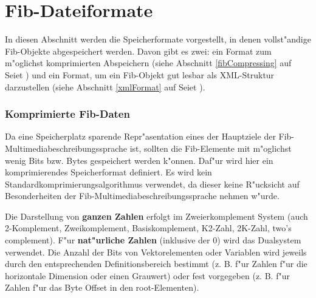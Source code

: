 %
%
%
%
%

\newpage
\part{Fib-Dateiformate}
\label{partFileFormat}

In diesen Abschnitt werden die Speicherformate vorgestellt, in denen vollst"andige Fib-Objekte abgespeichert werden. Davon gibt es zwei: ein Format zum m"oglichst komprimierten Abspeichern (siehe Abschnitt \ref{fibCompressing} auf Seiet \pageref{fibCompressing}) und ein Format, um ein Fib-Objekt gut lesbar als XML-Struktur darzustellen (siehe Abschnitt \ref{xmlFormat} auf Seiet \pageref{xmlFormat}).


\section{Komprimierte Fib-Daten}
\label{fibCompressing}

Da eine Speicherplatz sparende Repr"asentation eines der Hauptziele der Fib-Multi\-media\-be\-schrei\-bungs\-sprache ist, sollten die Fib-Elemente mit m"oglichst wenig Bits bzw. Bytes gespeichert werden k"onnen. Daf"ur wird hier ein komprimierendes Speicherformat definiert. Es wird kein Standardkomprimierungsalgorithmus verwendet, da dieser keine R"ucksicht auf Besonderheiten der Fib-Multimedia\-be\-schrei\-bungs\-sprache nehmen w"urde.


Die Darstellung von \textbf{ganzen Zahlen} erfolgt im Zweierkomplement System (auch 2-Komplement, Zweikomplement, Basiskomplement, K2-Zahl, 2K-Zahl, two's complement). F"ur \textbf{nat"urliche Zahlen} (inklusive der $0$) wird das Dualsystem verwendet. Die Anzahl der Bits von Vektorelementen oder Variablen wird jeweils durch den entsprechenden Definitionsbereich bestimmt (z. B. f"ur Zahlen f"ur die horizontale Dimension oder einen Grauwert) oder fest vorgegeben (z. B. f"ur Zahlen f"ur das Byte Offset in den root-Elementen).

